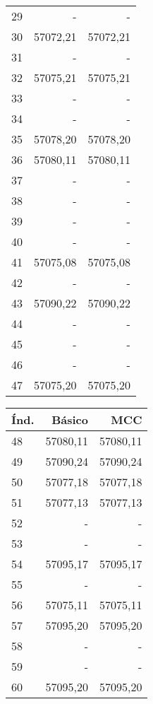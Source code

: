 \begin{appendix}
\begin{table}[h!]
\begin{tabular}{|l|r|r|}
29& -              & -              \\
30& 57072,21   & 57072,21   \\
31& -              & -              \\
32& 57075,21   & 57075,21   \\
33& -              & -              \\
34& -              & -              \\
35& 57078,20   & 57078,20   \\
36& 57080,11   & 57080,11   \\
37& -              & -              \\
38& - & - \\
39& -              & -              \\
40& -              & -              \\
41& 57075,08     & 57075,08              \\
42& -              & -              \\
43& 57090,22   & 57090,22   \\
44& -              & -              \\
45& -              & -              \\
46& -              & -              \\
47& 57075,20   & 57075,20   \\\hline
\end{tabular}
\quad
\begin{tabular}{|l|r|r|}
\hline
\textbf{\'Ind.} & \textbf{B\'asico} & \textbf{MCC}\\\hline
48& 57080,11   & 57080,11   \\
49& 57090,24   & 57090,24   \\
50& 57077,18   & 57077,18   \\
51& 57077,13   & 57077,13  \\
52& -              & -              \\
53& -              & -              \\
54& 57095,17              & 57095,17              \\
55& -              & -              \\
56& 57075,11   & 57075,11   \\
57& 57095,20   & 57095,20   \\
58& -              & -              \\
59& -              & -              \\
60& 57095,20              & 57095,20             \\

\end{tabular}
\end{table}
\end{appendix}
